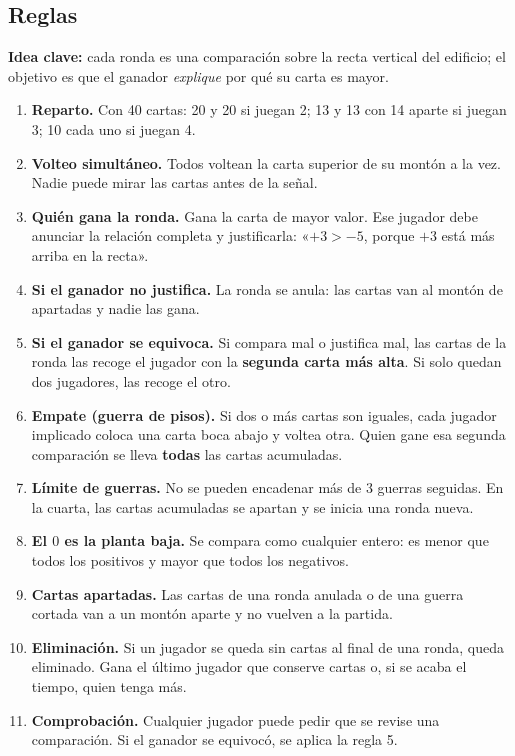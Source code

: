 \documentclass[12pt, letterpaper]{article}
\begin{document}
\subsection{Reglas}

\textbf{Idea clave:} cada ronda es una comparación sobre la recta vertical del edificio; el objetivo es que el ganador \emph{explique} por qué su carta es mayor.

\begin{enumerate}[leftmargin=*]
  \item \textbf{Reparto.} Con 40 cartas: 20 y 20 si juegan 2; 13 y 13 con 14 aparte si juegan 3; 10 cada uno si juegan 4.
  \item \textbf{Volteo simultáneo.} Todos voltean la carta superior de su montón a la vez. Nadie puede mirar las cartas antes de la señal.
  \item \textbf{Quién gana la ronda.} Gana la carta de mayor valor. Ese jugador debe anunciar la relación completa y justificarla: «$+3>-5$, porque $+3$ está más arriba en la recta».
  \item \textbf{Si el ganador no justifica.} La ronda se anula: las cartas van al montón de apartadas y nadie las gana.
  \item \textbf{Si el ganador se equivoca.} Si compara mal o justifica mal, las cartas de la ronda las recoge el jugador con la \textbf{segunda carta más alta}. Si solo quedan dos jugadores, las recoge el otro.
  \item \textbf{Empate (guerra de pisos).} Si dos o más cartas son iguales, cada jugador implicado coloca una carta boca abajo y voltea otra. Quien gane esa segunda comparación se lleva \textbf{todas} las cartas acumuladas.
  \item \textbf{Límite de guerras.} No se pueden encadenar más de 3 guerras seguidas. En la cuarta, las cartas acumuladas se apartan y se inicia una ronda nueva.
  \item \textbf{El $0$ es la planta baja.} Se compara como cualquier entero: es menor que todos los positivos y mayor que todos los negativos.
  \item \textbf{Cartas apartadas.} Las cartas de una ronda anulada o de una guerra cortada van a un montón aparte y no vuelven a la partida.
  \item \textbf{Eliminación.} Si un jugador se queda sin cartas al final de una ronda, queda eliminado. Gana el último jugador que conserve cartas o, si se acaba el tiempo, quien tenga más.
  \item \textbf{Comprobación.} Cualquier jugador puede pedir que se revise una comparación. Si el ganador se equivocó, se aplica la regla 5.
\end{enumerate}
\end{document}
